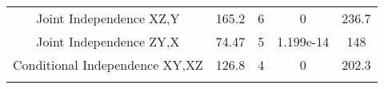 \documentclass[]{article}
\begin{document}
\begin{longtable}[c]{@{}ccccc@{}}
\begin{minipage}[t]{0.37\columnwidth}\centering\strut
Joint Independence XZ,Y
\strut\end{minipage} &
\begin{minipage}[t]{0.07\columnwidth}\centering\strut
165.2
\strut\end{minipage} &
\begin{minipage}[t]{0.06\columnwidth}\centering\strut
6
\strut\end{minipage} &
\begin{minipage}[t]{0.12\columnwidth}\centering\strut
0
\strut\end{minipage} &
\begin{minipage}[t]{0.06\columnwidth}\centering\strut
236.7
\strut\end{minipage}\tabularnewline
\begin{minipage}[t]{0.37\columnwidth}\centering\strut
Joint Independence ZY,X
\strut\end{minipage} &
\begin{minipage}[t]{0.07\columnwidth}\centering\strut
74.47
\strut\end{minipage} &
\begin{minipage}[t]{0.06\columnwidth}\centering\strut
5
\strut\end{minipage} &
\begin{minipage}[t]{0.12\columnwidth}\centering\strut
1.199e-14
\strut\end{minipage} &
\begin{minipage}[t]{0.06\columnwidth}\centering\strut
148
\strut\end{minipage}\tabularnewline
\begin{minipage}[t]{0.37\columnwidth}\centering\strut
Conditional Independence XY,XZ
\strut\end{minipage} &
\begin{minipage}[t]{0.07\columnwidth}\centering\strut
126.8
\strut\end{minipage} &
\begin{minipage}[t]{0.06\columnwidth}\centering\strut
4
\strut\end{minipage} &
\begin{minipage}[t]{0.12\columnwidth}\centering\strut
0
\strut\end{minipage} &
\begin{minipage}[t]{0.06\columnwidth}\centering\strut
202.3
\strut\end{minipage}\tabularnewline
\begin{minipage}[t]{0.37\columnwidth}\centering\strut

\end{minipage}
\end{longtable}
\end{document}

